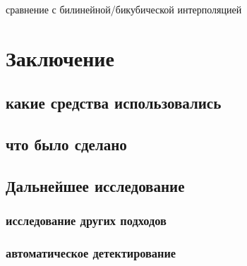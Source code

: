 сравнение с билинейной/бикубической интерполяцией

\section{Заключение}

\subsection{какие средства использовались}

\subsection{что было сделано}

\subsection{Дальнейшее исследование}

\subsubsection{исследование других подходов}

\subsubsection{автоматическое детектирование}

\newpage
\nocite{*}




